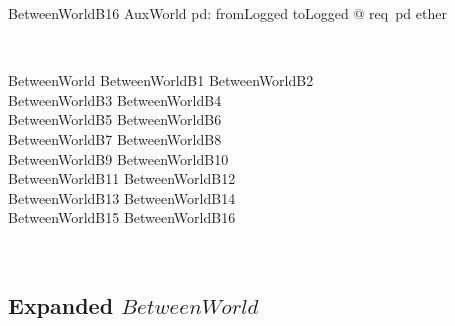 \begin{LNewSDef}
\begin{schema}{BetweenWorldB16}
   AuxWorld
\where
\forall pd: fromLogged \cup toLogged @ req~pd \in ether
\end{schema}~\end{LNewSDef}

\begin{LSDef}
\begin{zed}
   BetweenWorld  BetweenWorldB1 \land BetweenWorldB2 \land \\
                BetweenWorldB3 \land BetweenWorldB4 \land \\
                BetweenWorldB5 \land BetweenWorldB6 \land \\
                BetweenWorldB7  \land BetweenWorldB8 \land \\
                BetweenWorldB9 \land BetweenWorldB10 \land \\
                BetweenWorldB11 \land BetweenWorldB12 \land \\
                BetweenWorldB13 \land BetweenWorldB14 \land \\
                BetweenWorldB15 \land BetweenWorldB16
\end{zed}~\end{LSDef}

\subsection*{Expanded $BetweenWorld$}

